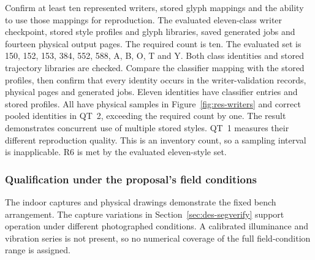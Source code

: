 Confirm at least ten represented writers, stored glyph mappings and the ability to use those mappings for reproduction.
The evaluated eleven-class writer checkpoint, stored style profiles and glyph libraries, saved generated jobs and fourteen physical output pages.
The required count is ten. The evaluated set is 150, 152, 153, 384, 552, 588, A, B, O, T and Y. Both class identities and stored trajectory libraries are checked.
Compare the classifier mapping with the stored profiles, then confirm that every identity occurs in the writer-validation records, physical pages and generated jobs.
Eleven identities have classifier entries and stored profiles. All have physical samples in Figure~\ref{fig:res-writers} and correct pooled identities in QT~2, exceeding the required count by one.
The result demonstrates concurrent use of multiple stored styles. QT~1 measures their different reproduction quality.
This is an inventory count, so a sampling interval is inapplicable. R6 is met by the evaluated eleven-style set.

\subsubsection{Qualification under the proposal's field conditions}
\label{sec:res-conditions}
The indoor captures and physical drawings demonstrate the fixed bench arrangement. The capture variations in Section~\ref{sec:des-segverify} support operation under different photographed conditions. A calibrated illuminance and vibration series is not present, so no numerical coverage of the full field-condition range is assigned.
\FloatBarrier
